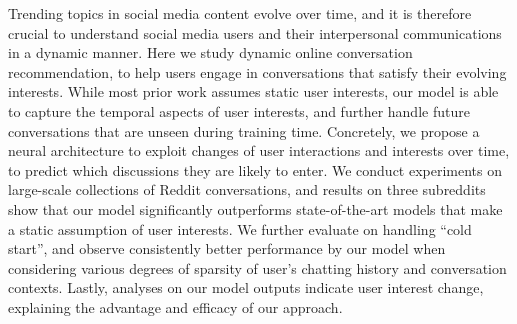 Trending topics in social media content evolve over time, and it is therefore crucial to understand social media users and their interpersonal communications in a dynamic manner. Here we study dynamic online conversation recommendation, to help users engage in conversations that satisfy their evolving interests. While most prior work assumes static user interests, our model is able to capture the temporal aspects of user interests, and further handle future conversations that are unseen during training time. Concretely, we propose a neural architecture to exploit changes of user interactions and interests over time, to predict which discussions they are likely to enter. We conduct experiments on large-scale collections of Reddit conversations, and results on three subreddits show that our model significantly outperforms state-of-the-art models that make a static assumption of user interests. We further evaluate on handling ``cold start'', and observe consistently better performance by our model when considering various degrees of sparsity of user's chatting history and conversation contexts. Lastly, analyses on our model outputs indicate user interest change, explaining the advantage and efficacy of our approach.
